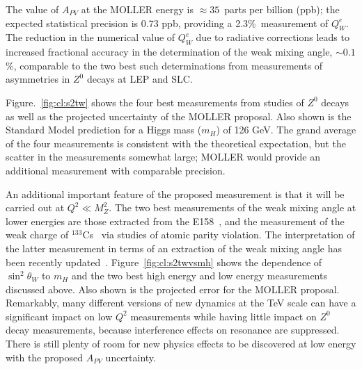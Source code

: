 The value of $A_{PV}$ at the MOLLER energy is 
$\approx 35$~parts per billion (ppb); the expected statistical precision is 0.73 ppb,
providing a 2.3\%\ measurement of $Q^e_W$. The reduction in the numerical value of $Q^e_W$ 
due to radiative corrections leads to increased fractional accuracy in the determination of the weak mixing
 angle, $\sim 0.1$\%, comparable to the two best such determinations from measurements of asymmetries in
$Z^0$ decays at LEP and SLC. 

Figure.~\ref{fig:cl:s2tw} shows
the four best measurements from studies of $Z^{0}$ decays~\cite{ref:cl:lepewwg}
as well as the projected uncertainty of the MOLLER proposal. Also shown
is the Standard Model prediction for a Higgs mass ($m_H$) of 126 GeV. The grand average of the
four measurements is consistent with the theoretical expectation, but the scatter in the measurements
somewhat large;  MOLLER would provide an additional measurement with comparable precision. 

An additional important feature of the proposed measurement is that it will be carried out at $Q^2\ll M_Z^2$.
The two best measurements of the weak mixing angle at lower energies are those extracted from the
E158~\cite{ref:cl:Anthony:2005pm}, 
and the measurement of the weak charge of $^{133}$Cs~\cite{ref:cl:csapv} via studies of atomic parity violation. The interpretation of the latter measurement in terms of an extraction of the weak mixing angle has
been recently updated~\cite{ref:cl:cuspidate}. Figure~\ref{fig:cl:s2twvsmh} shows the dependence 
of $\sin^2\theta_W$ to $m_H$ and the two best high energy and low energy measurements discussed above.
Also shown is the projected error for the MOLLER proposal. Remarkably, many different versions of new dynamics
at the TeV scale can have a significant impact on low $Q^2$ measurements while having little impact on
$Z^0$ decay measurements, because interference effects on resonance are suppressed. There
is still plenty of room for new physics effects to be discovered at low energy with the proposed $A_{PV}$ 
uncertainty. 


